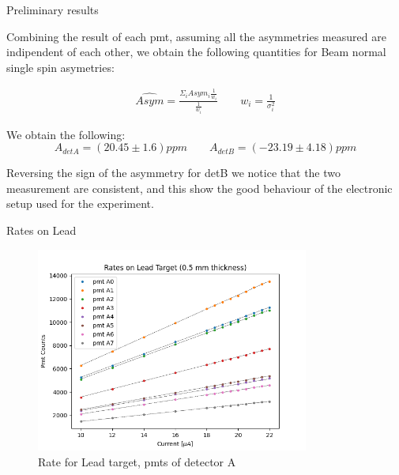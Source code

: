 \documentclass[8pt,a4paper]{beamer}
\begin{document}
\begin{frame}{Preliminary results}
 
Combining the result of each pmt, assuming all the asymmetries measured are indipendent of each other, we obtain the following quantities for Beam normal single spin asymetries:

\begin{gather*}
\hat{Asym} =  \frac{\Sigma_{i} Asym_{i} \frac{1}{w_{i}}}{\frac{1}{w_{i}}} \qquad w_{i} = \frac{1}{\sigma^{2}_{i}}
\end{gather*}

We obtain the following:
\begin{equation}
A_{detA} = (20.45 \pm 1.6) ppm  \qquad A_{detB} = (-23.19  \pm 4.18)ppm
\end{equation}

Reversing the sign of the asymmetry for detB we notice that the two measurement are consistent, and this show the good behaviour of the electronic setup used for the experiment. 

\end{frame}

\begin{frame}{Rates on Lead}

\begin{figure}[hbtp]
\centering
\includegraphics[width = 0.8\textwidth]{figures/Rates_on_Lead.png}
\caption{Rate for Lead target, pmts of detector A}
\end{figure}


\end{frame}
\end{document}
